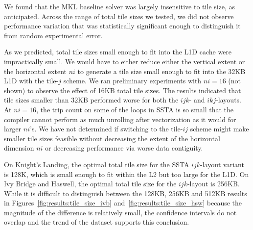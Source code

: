 \documentclass{sig-alternate-05-2015}
\begin{document}
We found that the MKL baseline solver was largely insensitive to tile size, as
  anticipated.
Across the range of total tile sizes we tested, we did not observe performance
  variation that was statistically significant enough to distinguish it from
  random experimental error.

As we predicted, total tile sizes small enough to fit into the L1D cache were
  impractically small.
We would have to either reduce either the vertical extent or the horizontal
  extent \(ni\) to generate a tile size small enough to fit into the 32KB L1D
  with the tile-\(j\) scheme.
We ran preliminary experiments with \(ni=16\) (not shown) to observe the effect
  of 16KB total tile sizes.
The results indicated that tile sizes smaller than 32KB performed worse for both
  the \(ijk\)- and \(ikj\)-layouts.
At \(ni=16\), the trip count on some of the loops in SSTA is so small that the
  compiler cannot perform as much unrolling after vectorization as it would for
  larger \(ni\)'s.
We have not determined if switching to the tile-\(ij\) scheme might make
  smaller tile sizes feasible without decreasing the extent of the horizontal
  dimension \(ni\) or decreasing performance via worse data contiguity.


On Knight's Landing, the optimal total tile size for the SSTA \(ijk\)-layout
  variant is 128K, which is small enough to fit within the L2 but too large
  for the L1D. 
On Ivy Bridge and Haswell, the optimal total tile size for the \(ijk\)-layout 
  is 256KB.
While it is difficult to distinguish between the 128KB, 256KB and 512KB results
  in Figures~\ref{fig:results:tile_size_ivb} and~\ref{fig:results:tile_size_hsw}
  because the magnitude of the difference is relatively small, the confidence
  intervals do not overlap and the trend of the dataset supports this conclusion.
\end{document}
